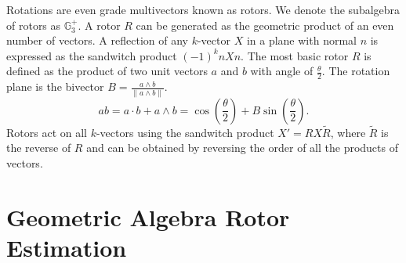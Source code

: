 \documentclass{birkjour}
\numberwithin{equation}{section}
\begin{document}
Rotations are even grade multivectors known as rotors. We denote the subalgebra of rotors as $\mathbb{G}^{+}_3$. A rotor $R$ can be generated as the geometric product of an even number of vectors. A reflection of any $k$-vector $X$ in a plane with normal $n$ is expressed as the sandwitch product $(-1)^k n X n$. The most basic rotor $R$ is defined as the product of two unit vectors $a$ and $b$ with angle of $\frac{\theta}{2}$. The rotation plane is the bivector $B = \frac{a \wedge b}{\| a \wedge b \|}$.
\begin{equation*}
a b = a \cdot b + a \wedge b = \cos\left( \frac{\theta}{2} \right) + B \sin\left( \frac{\theta}{2} \right).
\end{equation*}
Rotors act on all $k$-vectors using the sandwitch product $X' = R X \tilde R$, where $\tilde R$ is the reverse of $R$ and can be obtained by reversing the order of all the products of vectors.

\section{Geometric Algebra Rotor Estimation}
\end{document}
